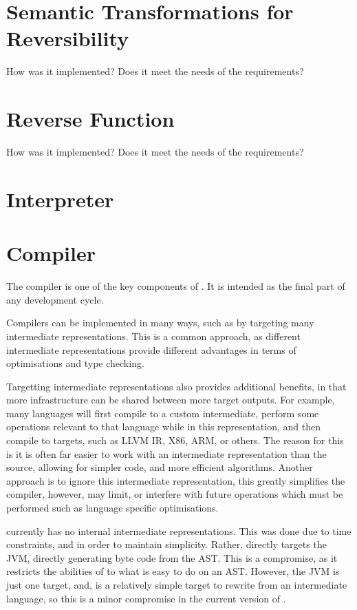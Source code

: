 \section{Semantic Transformations for Reversibility}

How was it implemented?
Does it meet the needs of the requirements?

\section{Reverse Function}

How was it implemented?
Does it meet the needs of the requirements?

\section{Interpreter}


\section{Compiler}

The compiler is one of the key components of \rimp. It is intended as the final part of any development cycle. 

Compilers can be implemented in many ways, such as by targeting many intermediate representations. This is a common approach, as different intermediate representations provide different advantages in terms of optimisations and type checking. 

Targetting intermediate representations also provides additional benefits, in that more infrastructure can be shared between more target outputs. For example, many languages will first compile to a custom intermediate, perform some operations relevant to that language while in this representation, and then compile to targets, such as LLVM IR, X86, ARM, or others. The reason for this is it is often far easier to work with an intermediate representation than the source, allowing for simpler code, and more efficient algorithms.
Another approach is to ignore this intermediate representation, this greatly simplifies the compiler, however, may limit, or interfere with future operations which must be performed such as language specific optimisations.

\rimp currently has no internal intermediate representations. This was done due to time constraints, and in order to maintain simplicity. Rather, \rimp directly targets the JVM, directly generating byte code from the AST. This is a compromise, as it restricts the abilities of \rimp to what is easy to do on an AST. However, the JVM is just one target, and, is a relatively simple target to rewrite from an intermediate language, so this is a minor compromise in the current version of \rimp.

